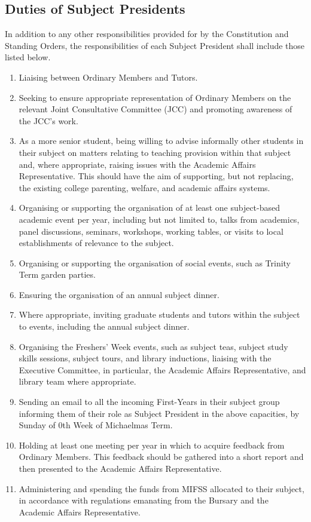 \subsection{Duties of Subject Presidents} \label{ssec:roles_subjpres_duties}
In addition to any other responsibilities provided for by the Constitution and Standing Orders, the responsibilities of each Subject President shall include those listed below.
\begin{enumerate}
    \item Liaising between Ordinary Members and Tutors.
    \item Seeking to ensure appropriate representation of Ordinary Members on the relevant Joint Consultative Committee (JCC) and promoting awareness of the JCC's work.
    \item As a more senior student, being willing to advise informally other students in their subject on matters relating to teaching provision within that subject and, where appropriate, raising issues with the Academic Affairs Representative. This should have the aim of supporting, but not replacing, the existing college parenting, welfare, and academic affairs systems.
    \item Organising or supporting the organisation of at least one subject-based academic event per year, including but not limited to, talks from academics, panel discussions, seminars, workshops, working tables, or visits to local establishments of relevance to the subject.
    \item Organising or supporting the organisation of social events, such as Trinity Term garden parties.
    \item Ensuring the organisation of an annual subject dinner.
    \item Where appropriate, inviting graduate students and tutors within the subject to events, including the annual subject dinner.
    \item Organising the Freshers' Week events, such as subject teas, subject study skills sessions, subject tours, and library inductions, liaising with the Executive Committee, in particular, the Academic Affairs Representative, and library team where appropriate.
    \item Sending an email to all the incoming First-Years in their subject group informing them of their role as Subject President in the above capacities, by Sunday of 0th Week of Michaelmas Term.
    \item Holding at least one meeting per year in which to acquire feedback from Ordinary Members. This feedback should be gathered into a short report and then presented to the Academic Affairs Representative.
    \item Administering and spending the funds from MIFSS allocated to their subject, in accordance with regulations emanating from the Bursary and the Academic Affairs Representative.
\end{enumerate}
